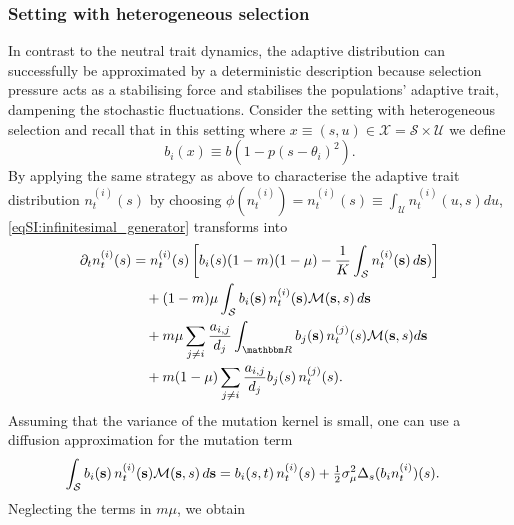 \subsubsection{Setting with heterogeneous selection}\label{sec:anal_sett_2}
In contrast to the neutral trait dynamics, the adaptive distribution can successfully be approximated by a deterministic description because selection pressure acts as a stabilising force and stabilises the populations' adaptive trait, dampening the stochastic fluctuations.
%
Consider the setting with heterogeneous selection and recall that in this setting where $x \equiv (s,u) \in \mathcal{X} = \mathcal{S} \times \mathcal{U}$ we define
\begin{equation}\label{eqSI:b_d_sett2}
  b_i(x) \equiv b(1-p(s-\theta_i)^2).
\end{equation}
%
By applying the same strategy as above to characterise the adaptive trait distribution $n^{(i)}_t(s)$ by choosing $\phi(n^{(i)}_t) = n^{(i)}_t(s) \equiv \int_\mathcal{U} n^{(i)}_t(u,s) du $, \cref{eqSI:infinitesimal_generator} transforms into
%
\begin{equation}\label{eqSI:general_equation}
    \begin{split}
    \partial_t n_t^{(i)}(s) &= n_t^{(i)}(s)\left[b_i(s)(1-m)(1-\mu) - \frac{1}{K}\int_\mathcal{S} n_t^{(i)}({\textbf s}) \, d {\textbf s})\right] \\
    &\quad + (1- m)\mu \int_\mathcal{S} b_i({\textbf s}) \, n_t^{(i)}( {\textbf s})  \mathcal{M}({\textbf s}, s) \, d{\textbf s} \\
    &\quad + m \mu \sum_{j\neq i}\frac{a_{i,j}}{d_j}  \int_\R b_j({\textbf s}) \,  n_t^{(j)}(s) \mathcal{M}({\textbf s}, s) d{\textbf s}\\
    &\quad + m (1 - \mu) \sum_{j\neq i}\frac{a_{i,j}}{d_j}  b_j(s) \, n_t^{(j)}(s).
  \end{split}
\end{equation}
%
Assuming that the variance of the mutation kernel is small, one can use a diffusion approximation for the mutation term \cite{Kimura1965,Debarre2013,Mirrahimi2020}
\begin{equation}
  \begin{split}
  \int_\mathcal{S} b_i({\textbf s}) \, n_t^{(i)}({\textbf s}) \mathcal{M}({\textbf s}, s) \, d{\textbf s} 
          &= b_i(s,t) \, n_t^{(i)}(s) + \tfrac{1}{2} \sigma_\mu^2 \Delta_s ( b_i n_t^{(i)})(s) .
  \end{split}
\end{equation}
%
Neglecting the terms in $m \mu$, we obtain
